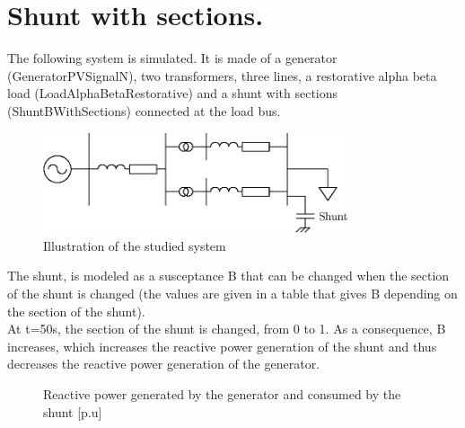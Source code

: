 \documentclass[a4paper, 12pt]{report}
\begin{document}
\chapter{Shunt with sections.}

The following system is simulated. It is made of a generator (GeneratorPVSignalN), two transformers, three lines, a restorative alpha beta load (LoadAlphaBetaRestorative) and a shunt with sections (ShuntBWithSections) connected at the load bus.\\

\begin{figure}[H]
  \begin{center}
  \includegraphics[width=0.8\textwidth]{ShuntsNoRegulation}
  \end{center}
  \caption{Illustration of the studied system}
\end{figure}

The shunt, is modeled as a susceptance B that can be changed when the section of the shunt is changed (the values are given in a table that gives B depending on the section of the shunt).\\

At t=50s, the section of the shunt is changed, from 0 to 1. As a consequence, B increases, which increases the reactive power generation of the shunt and thus decreases the reactive power generation of the generator.\\


\begin{figure}[H]
  \caption{Reactive power generated by the generator and consumed by the shunt [p.u]}
\end{figure}
\end{document}

